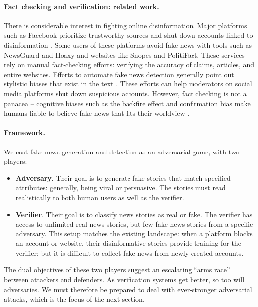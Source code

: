 \documentclass{article}
\begin{document}
\paragraph{Fact checking and verification: related work.}
There is considerable interest in fighting online disinformation. Major platforms such as Facebook prioritize trustworthy sources and shut down accounts linked to disinformation \citep{mosseri2018news,dwoskin2018facebook}. Some users of these platforms avoid fake news with tools such as NewsGuard and Hoaxy \citep{shao2016hoaxy} and websites like Snopes and PolitiFact. These services rely on manual fact-checking efforts: verifying the accuracy of claims, articles, and entire websites. 
Efforts to automate fake news detection generally point out stylistic biases that exist in the text \citep{rashkin2017truth, wang2017liar,perez2018automatic}. These efforts can help moderators on social media platforms shut down suspicious accounts. However, fact checking is not a panacea -- cognitive biases such as the backfire effect and confirmation bias make humans liable to believe fake news that fits their worldview \citep{swire2017role}.

\paragraph{Framework.}\hspace{-1mm} We cast fake news generation and detection as an adversarial game, with two players:

\begin{itemize}[wide, leftmargin=10pt, labelwidth=!,labelindent=0pt,noitemsep,topsep=0pt]
    \item \textbf{Adversary}. Their goal is to generate fake stories that match specified attributes: generally, being viral or persuasive. The stories must read realistically to both human users as well as the verifier. 
    \item \textbf{Verifier}. Their goal is to classify news stories as real or fake. The verifier has access to unlimited real news stories, but few fake news stories from a specific adversary. This setup matches the existing landscape: when a platform blocks an account or website,
    their disinformative stories provide training for the verifier; but 
    it is difficult to collect fake news from newly-created accounts.
\end{itemize}

The dual objectives of these two players suggest an escalating ``arms race'' between attackers and defenders. As verification systems get better, so too will adversaries. We must therefore be prepared to deal with ever-stronger adversarial attacks, which is the focus of the next section.
\end{document}
